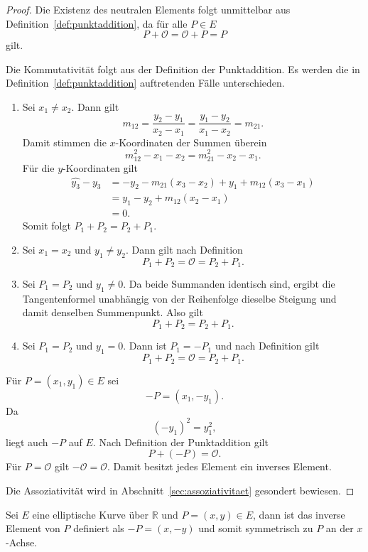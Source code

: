 \begin{proof}
    Die Existenz des neutralen Elements folgt unmittelbar aus
    Definition~\ref{def:punktaddition}, da für alle $P\in E$
    \[
        P+\mathcal{O}=\mathcal{O}+P=P
    \]
    gilt.

    Die Kommutativität folgt aus der Definition der Punktaddition. Es werden die in Definition~\ref{def:punktaddition} auftretenden Fälle unterschieden.
    \begin{enumerate}
        \item Sei $x_1\neq x_2$. Dann gilt
              \[
                  m_{12}
                  =\frac{y_2-y_1}{x_2-x_1}
                  =\frac{y_1-y_2}{x_1-x_2}
                  =m_{21}.
              \]
              Damit stimmen die $x$-Koordinaten der Summen überein
              \[
                  m_{12}^2-x_1-x_2
                  =
                  m_{21}^2-x_2-x_1.
              \]
              Für die $y$-Koordinaten gilt
              \[
                  \begin{aligned}
                      \hat{y_3}-y_3
                       & =
                      -y_2-m_{21}(x_3-x_2)
                      +y_1+m_{12}(x_3-x_1)    \\
                       & =
                      y_1-y_2+m_{12}(x_2-x_1) \\
                       & =0.
                  \end{aligned}
              \]
              Somit folgt $P_1+P_2=P_2+P_1$.

        \item Sei $x_1=x_2$ und $y_1\neq y_2$. Dann gilt nach Definition
              \[
                  P_1+P_2=\mathcal{O}=P_2+P_1.
              \]

        \item Sei $P_1=P_2$ und $y_1\neq 0$. Da beide Summanden identisch sind,
              ergibt die Tangentenformel unabhängig von der Reihenfolge dieselbe
              Steigung und damit denselben Summenpunkt. Also gilt
              \[
                  P_1+P_2=P_2+P_1.
              \]

        \item Sei $P_1=P_2$ und $y_1=0$. Dann ist $P_1=-P_1$ und nach Definition gilt
              \[
                  P_1+P_2=\mathcal{O}=P_2+P_1.
              \]
    \end{enumerate}
    Für $P=(x_1,y_1)\in E$ sei
    \[
        -P=(x_1,-y_1).
    \]
    Da
    \[
        {(-y_1)}^2=y_1^2,
    \]
    liegt auch $-P$ auf $E$. Nach Definition der Punktaddition gilt
    \[
        P+(-P)=\mathcal{O}.
    \]
    Für $P=\mathcal{O}$ gilt $-\mathcal{O}=\mathcal{O}$.
    Damit besitzt jedes Element ein inverses Element.

    Die Assoziativität wird in Abschnitt~\ref{sec:assoziativitaet}
    gesondert bewiesen.
\end{proof}
\begin{bemerkung}
    Sei $E$ eine elliptische Kurve über $\mathbb{R}$ und $P=(x,y)\in E$, dann ist das inverse Element von $P$ definiert als $-P=(x,-y)$ und somit symmetrisch zu $P$ an der $x$-Achse.
\end{bemerkung}


